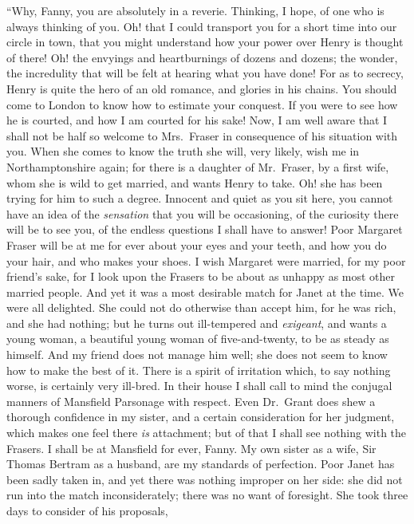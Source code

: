 ``Why, Fanny, you are absolutely in a reverie.
Thinking, I hope, of one who is always thinking of you.
Oh! that I could transport you for a short time into
our circle in town, that you might understand how your
power over Henry is thought of there!  Oh! the envyings
and heartburnings of dozens and dozens; the wonder,
the incredulity that will be felt at hearing what you
have done!  For as to secrecy, Henry is quite the hero
of an old romance, and glories in his chains.  You should
come to London to know how to estimate your conquest.
If you were to see how he is courted, and how I am courted
for his sake!  Now, I am well aware that I shall not be
half so welcome to Mrs.\ Fraser in consequence of his
situation with you.  When she comes to know the truth
she will, very likely, wish me in Northamptonshire again;
for there is a daughter of Mr.\ Fraser, by a first wife,
whom she is wild to get married, and wants Henry to take.
Oh! she has been trying for him to such a degree.
Innocent and quiet as you sit here, you cannot have an
idea of the \emph{sensation} that you will be occasioning,
of the curiosity there will be to see you, of the endless
questions I shall have to answer!  Poor Margaret Fraser
will be at me for ever about your eyes and your teeth,
and how you do your hair, and who makes your shoes.
I wish Margaret were married, for my poor friend's sake,
for I look upon the Frasers to be about as unhappy as most
other married people.  And yet it was a most desirable
match for Janet at the time.  We were all delighted.
She could not do otherwise than accept him, for he was rich,
and she had nothing; but he turns out ill-tempered
and \emph{exigeant}, and wants a young woman, a beautiful young
woman of five-and-twenty, to be as steady as himself.
And my friend does not manage him well; she does not seem
to know how to make the best of it.  There is a spirit
of irritation which, to say nothing worse, is certainly
very ill-bred. In their house I shall call to mind the
conjugal manners of Mansfield Parsonage with respect.
Even Dr.\ Grant does shew a thorough confidence in my sister,
and a certain consideration for her judgment, which makes
one feel there \emph{is} attachment; but of that I shall
see nothing with the Frasers.  I shall be at Mansfield
for ever, Fanny.  My own sister as a wife, Sir Thomas
Bertram as a husband, are my standards of perfection.
Poor Janet has been sadly taken in, and yet there was
nothing improper on her side:  she did not run into the
match inconsiderately; there was no want of foresight.
She took three days to consider of his proposals,
